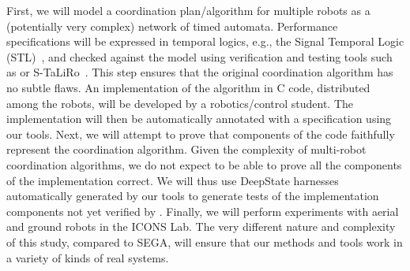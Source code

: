 First, we will model a coordination plan/algorithm for multiple robots as a (potentially very complex) network of timed automata.
Performance specifications will be expressed in temporal logics, e.g., the Signal Temporal Logic (STL)~\cite{donze2010robust}, and checked against the model using verification and testing tools such as \uppaal or S-TaLiRo~\cite{annpureddy2011s}.
This step ensures that the original coordination algorithm has no subtle flaws.
An implementation of the algorithm in C code, distributed among the robots, will be developed by a robotics/control student.
The implementation will then be automatically annotated with a specification using our tools.
Next, we will attempt to prove that components of the code faithfully represent the coordination algorithm.
Given the complexity of multi-robot coordination algorithms, we do not expect \framac to be able to prove all the components of the implementation correct.
We will thus use DeepState harnesses automatically generated by our tools to generate tests of the implementation components not yet verified by \framac.
Finally, we will perform experiments with aerial and ground robots in the ICONS Lab.
The very different nature and complexity of this study, compared to SEGA, will ensure that our methods and tools work in a variety of kinds of real systems.


